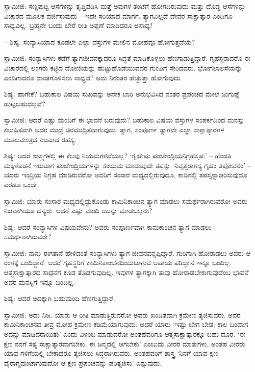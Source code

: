 ಸ್ವಾಮೀಜಿ: ಸಣ್ಣಪುಟ್ಟ ಆಸೆಗಳನ್ನು ತೃಪ್ತಿಪಡಿಸಿ ಮತ್ತೆ ಅವುಗಳ ತಂಟೆಗೆ ಹೋಗದಿರುವುದು ಮತ್ತು ದೊಡ್ಡ ಆಸೆಗಳನ್ನು ವಿಚಾರದ ಮೂಲಕ ವರ್ಜಿಸುವುದು – ಇದೇ ಸರಿಯಾದ ಮಾರ್ಗ. ತ್ಯಾಗವಿಲ್ಲದೆ ದೇವರ ಸಾಕ್ಷಾತ್ಕಾರ ಎಂದಿಗೂ ಸಾಧ್ಯವಿಲ್ಲ. ಬ್ರಹ್ಮನೇ ಬಂದು ಬೇರೆ ರೀತಿ ಅಪ್ಪಣೆ ಮಾಡಿದರೂ ಅಸಾಧ್ಯ!

– ಶಿಷ್ಯ: ಸಂನ್ಯಾಸಿಯಾದ ಕೂಡಲೇ ಎಲ್ಲಾ ವಸ್ತುಗಳ ಮೇಲಿನ ಮೋಹವೂ ಹೋಗುತ್ತದೆಯೆ?

ಸ್ವಾಮೀಜಿ: ಸಂನ್ಯಾಸಿಗಳು ಕಡೆಗೆ ತ್ಯಾಗಜೀವನಕ್ಕಾದರೂ ಸಿದ್ಧತೆ ಮಾಡಿಕೊಳ್ಳಲು ಹೆಣಗಾಡುತ್ತಿದ್ದಾರೆ. ಗೃಹಸ್ಥರಾದರೊ ಈ ವಿಚಾರದಲ್ಲಿ ಲಂಗರು ಕಟ್ಟಿದ ದೋಣಿಯನ್ನು ಹುಟ್ಟುಹೊಡೆಯುವವರ ಗುಂಪಿಗೆ ಸೇರಿದವರು. ಭೋಗಲಾಲಸೆಯನ್ನು ಎಂದಿಗಾದರೂ ಶಾಂತಗೊಳಿಸಲು ಸಾಧ್ಯವೆ? ಅದು ನಿರಂತರ ಹೆಚ್ಚುತ್ತಾ ಹೋಗುವುದು.

ಶಿಷ್ಯ: ಹಾಗೇಕೆ? ಬಹುಕಾಲ ವಿಷಯ ಸುಖವನ್ನು ಅನೇಕ ಬಾರಿ ಅನುಭವಿಸಿದ ನಂತರ ಪ್ರಪಂಚದ ಮೇಲೆ ಜುಗುಪ್ಸೆ ಹುಟ್ಟಬಹುದಲ್ಲವೆ?

ಸ್ವಾಮೀಜಿ: ಆದರೆ ಎಷ್ಟು ಮಂದಿಗೆ ಈ ಭಾವನೆ ಬರುವುದು? ಬಹುಕಾಲ ವಿಷಯ ವಸ್ತುಗಳ ಸಂಪರ್ಕದಿಂದ ಮನಸ್ಸು ಕಲುಷಿತವಾಗಿ ಅದರ ಮುದ್ರೆ ಚಿರಮುದ್ರಿತವಾಗುವುದು. ತ್ಯಾಗ, ಸಂಪೂರ್ಣ ತ್ಯಾಗವೇ ಎಲ್ಲಾ ಸಾಕ್ಷಾತ್ಕಾರಗಳ ಮೂಲಮಂತ್ರದ ನಿಜವಾದ ರಹಸ್ಯ.

ಶಿಷ್ಯ: ಆದರೆ ಶಾಸ್ತ್ರಗಳಲ್ಲಿ ಈ ಕೆಲವು ನಿಯಮಗಳಿವೆಯಲ್ಲ? ‘ಗೃಹೇಷು ಪಂಚೇಂದ್ರಿಯನಿಗ್ರಹಸ್ತಪಃ’ – ಹೆಂಡತಿ ಮಕ್ಕಳೊಡನೆ ಇರುವಾಗ ಪಂಚೇಂದ್ರಿಯಗಳನ್ನು ಸಂಯಮ ಮಾಡುವುದೇ ತಪಸ್ಸು. ನಿವೃತ್ತರಾಗಸ್ಯ ಗೃಹಂ ತಪೋವನಂ' – ಯಾರು ಇಂದ್ರಿಯ ನಿಗ್ರಹ ಮಾಡಿರುವರೋ ಅವರಿಗೆ ಸಂಸಾರ ಮಧ್ಯದಲ್ಲಿರುವುದೂ, ಕಾಡಿನಲ್ಲಿ ತಪಸ್ಸನ್ನಾಚರಿಸುವುದೂ ಎರಡೂ ಒಂದೇ.

ಸ್ವಾಮಿಜಿ: ಯಾರು ಸಂಸಾರ ಮಧ್ಯದಲ್ಲಿದ್ದುಕೊಂಡು ಕಾಮಿನಿಕಾಂಚನ ತ್ಯಾಗ ಮಾಡಲು ಸಮರ್ಥರಾಗಿರುವರೋ ಅವರು ನಿಜವಾಗಿಯೂ ಧನ್ಯರು. ಆದರೆ ಎಷ್ಟು ಮಂದಿ ಅದನ್ನು ಮಾಡಬಲ್ಲರು?

ಶಿಷ್ಯ: ಆದರೆ ಸಂನ್ಯಾಸಿಗಳ ವಿಷಯವೇನು? ಅವರು ಸಂಪೂರ್ಣವಾಗಿ ಕಾಮಕಾಂಚನ ತ್ಯಾಗ ಮಾಡಲು ಸಮರ್ಥರಾಗಿರುವರೇ?

ಸ್ವಾಮೀಜಿ: ನಾನು ಈಗತಾನೆ ಹೇಳಿದಂತೆ ಸಂನ್ಯಾಸಿಗಳು ತ್ಯಾಗ ಜೀವನವನ್ನಪ್ಪಿದ್ದಾರೆ. ಗುರಿಗಾಗಿ ಹೋರಾಡಲು ಅವರು ಆ ರಂಗಕ್ಕೆ ಬಂದಿದ್ದಾರೆ. ಆದರೆ ಗೃಹಸ್ಥರಿಗೆ ಕಾಮಿನಿಕಾಂಚನದಿಂದುಟಾಗುವ ಅಪಾಯ ಪರಿಜ್ಞಾನ ಇನ್ನೂ ಬಂದಿಲ್ಲ. ಆತ್ಮಸಾಕ್ಷಾತ್ಕಾರದ ಸಾಧನೆಗೆ ಕೂಡ ತೊಡಗುವುದಿಲ್ಲ. ಇವುಗಳ ತ್ಯಾಗಕ್ಕಾಗಿ ತಾವು ಹೋರಾಡಬೇಕಾಗುವುದೆಂಬ ಭಾವನೆ ಅವರ ಮನಸ್ಸಿಗೆ ಇನ್ನೂ ಬಂದಿಲ್ಲ.

ಶಿಷ್ಯ: ಆದರೆ ಅದಕ್ಕಾಗಿ ಬಹುಮಂದಿ ಹೆಣಗುತ್ತಿದ್ದಾರೆ.

ಸ್ವಾಮೀಜಿ: ಅದು ನಿಜ. ಯಾರು ಆ ರೀತಿ ಮಾಡುತ್ತಿರುವರೋ ಅವರು ಖಂಡಿತವಾಗಿ ಕ್ರಮೇಣ ತ್ಯಜಿಸುವರು. ಅವರ ಕಾಮಿನಿಕಾಂಚನದ ತೀವ್ರ ಮೋಹ ಕ್ರಮೇಣ ಕಡಿಮೆಯಾಗುವುದು. ಆದರೆ ಯಾರು ‘ಇಷ್ಟು ಬೇಗ ಬೇಡ; ಕಾಲ ಬಂದಾಗ ಅದನ್ನು ಮಾಡಿದರಾಯಿತು’ ಎಂದು ವಿಳಂಬ ಮಾಡುವರೋ ಅಂತಹವರಿಗೂ ಆತ್ಮಸಾಕ್ಷಾತ್ಕಾರಕ್ಕೂ ಬಹು ದೂರ. ‘ಈ ಕ್ಷಣ ನನಗೆ ಸತ್ಯ ಸಾಕ್ಷಾತ್ಕಾರವಾಗಬೇಕು. ಈ ಜನ್ಮದಲ್ಲಿ ಆಗಬೇಕು’ ಎಂಬುದು ವೀರರ ಮಾತುಗಳು. ಅಂತಹ ವೀರರು ಯಾವ ಗಳಿಗೆಯಲ್ಲಿ ಬೇಕಾದರೂ ತ್ಯಜಿಸಲು ಸಿದ್ಧರಾಗಿರುವರು. ಅಂತಹವರಿಗೆ ಶಾಸ್ತ್ರ ‘ನಿನಗೆ ಯಾವ ಕ್ಷಣ ವೈರಾಗ್ಯವುಂಟಾಗುವುದೋ ಆ ಕ್ಷಣ ಪ್ರಪಂಚವನ್ನು ಪರಿತ್ಯಜಿಸು’ ಎನ್ನುವುದು.

